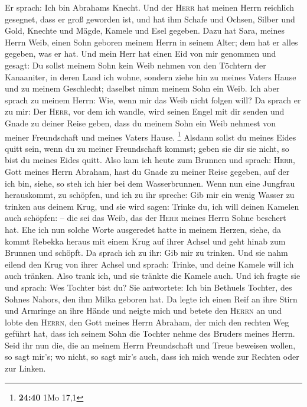  Er sprach: Ich bin Abrahams Knecht.  Und
der \textsc{Herr} hat meinen Herrn reichlich gesegnet, dass er groß
geworden ist, und hat ihm Schafe und Ochsen, Silber und Gold, Knechte
und Mägde, Kamele und Esel gegeben.  Dazu hat Sara,
meines Herrn Weib, einen Sohn geboren meinem Herrn in seinem Alter; dem
hat er alles gegeben, was er hat.  Und mein Herr hat
einen Eid von mir genommen und gesagt: Du sollst meinem Sohn kein Weib
nehmen von den Töchtern der Kanaaniter, in deren Land ich wohne,
 sondern ziehe hin zu meines Vaters Hause und zu meinem
Geschlecht; daselbst nimm meinem Sohn ein Weib.  Ich aber
sprach zu meinem Herrn: Wie, wenn mir das Weib nicht folgen will?
 Da sprach er zu mir: Der \textsc{Herr}, vor dem ich
wandle, wird seinen Engel mit dir senden und Gnade zu deiner Reise
geben, dass du meinem Sohn ein Weib nehmest von meiner Freundschaft und
meines Vaters Hause. \footnote{\textbf{24:40} 1Mo 17,1} 
Alsdann sollst du meines Eides quitt sein, wenn du zu meiner
Freundschaft kommst; geben sie dir sie nicht, so bist du meines Eides
quitt.  Also kam ich heute zum Brunnen und sprach:
\textsc{Herr}, Gott meines Herrn Abraham, hast du Gnade zu meiner Reise
gegeben, auf der ich bin,  siehe, so steh ich hier bei
dem Wasserbrunnen. Wenn nun eine Jungfrau herauskommt, zu schöpfen, und
ich zu ihr spreche: Gib mir ein wenig Wasser zu trinken aus deinem Krug,
 und sie wird sagen: Trinke du, ich will deinen Kamelen
auch schöpfen: -- die sei das Weib, das der \textsc{Herr} meines Herrn
Sohne beschert hat.  Ehe ich nun solche Worte ausgeredet
hatte in meinem Herzen, siehe, da kommt Rebekka heraus mit einem Krug
auf ihrer Achsel und geht hinab zum Brunnen und schöpft. Da sprach ich
zu ihr: Gib mir zu trinken.  Und sie nahm eilend den Krug
von ihrer Achsel und sprach: Trinke, und deine Kamele will ich auch
tränken. Also trank ich, und sie tränkte die Kamele auch.
 Und ich fragte sie und sprach: Wes Tochter bist du? Sie
antwortete: Ich bin Bethuels Tochter, des Sohnes Nahors, den ihm Milka
geboren hat. Da legte ich einen Reif an ihre Stirn und Armringe an ihre
Hände  und neigte mich und betete den \textsc{Herrn} an
und lobte den \textsc{Herrn}, den Gott meines Herrn Abraham, der mich
den rechten Weg geführt hat, dass ich seinem Sohn die Tochter nehme des
Bruders meines Herrn.  Seid ihr nun die, die an meinem
Herrn Freundschaft und Treue beweisen wollen, so sagt mir's; wo nicht,
so sagt mir's auch, dass ich mich wende zur Rechten oder zur Linken.

